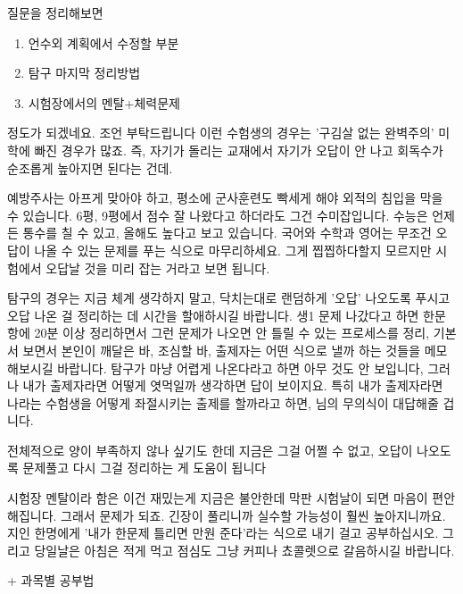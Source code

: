     질문을 정리해보면
    \begin{enumerate}
        \item 언수외 계획에서 수정할 부분
        \item 탐구 마지막 정리방법
        \item 시험장에서의 멘탈+체력문제
    \end{enumerate}
    정도가 되겠네요. 조언 부탁드립니다
    \vspace{5mm}
이런 수험생의 경우는 '구김살 없는 완벽주의' 미학에 빠진 경우가 많죠.
즉, 자기가 돌리는 교재에서 자기가 오답이 안 나고 회독수가 순조롭게 높아지면 된다는 건데.
\vspace{5mm}

예방주사는 아프게 맞아야 하고, 평소에 군사훈련도 빡세게 해야 외적의 침입을 막을 수 있습니다.
6평, 9평에서 점수 잘 나왔다고 하더라도 그건 수미잡입니다. 수능은 언제든 통수를 칠 수 있고, 올해도 높다고 보고 있습니다.
국어와 수학과 영어는 무조건 오답이 나올 수 있는 문제를 푸는 식으로 마무리하세요.
그게 찝찝하다할지 모르지만 시험에서 오답날 것을 미리 잡는 거라고 보면 됩니다.
\vspace{5mm}

탐구의 경우는 지금 체계 생각하지 말고, 닥치는대로 랜덤하게 '오답' 나오도록 푸시고
오답 나온 걸 정리하는 데 시간을 할애하시길 바랍니다.
생1 문제 나갔다고 하면 한문항에 20분 이상 정리하면서 그런 문제가 나오면 안 틀릴 수 있는 프로세스를 정리,
기본서 보면서 본인이 깨달은 바, 조심할 바, 출제자는 어떤 식으로 낼까 하는 것들을 메모해보시길 바랍니다.
탐구가 마냥 어렵게 나온다라고 하면 아무 것도 안 보입니다, 그러나 내가 출제자라면 어떻게 엿먹일까 생각하면 답이 보이지요.
특히 내가 출제자라면 나라는 수험생을 어떻게 좌절시키는 출제를 할까라고 하면, 님의 무의식이 대답해줄 겁니다.
\vspace{5mm}

전체적으로 양이 부족하지 않나 싶기도 한데 지금은 그걸 어쩔 수 없고, 오답이 나오도록 문제풀고 다시 그걸 정리하는 게 도움이 됩니다
\vspace{5mm}

시험장 멘탈이라 함은 이건 재밌는게
지금은 불안한데 막판 시험날이 되면 마음이 편안해집니다. 그래서 문제가 되죠. 긴장이 풀리니까 실수할 가능성이 훨씬 높아지니까요.
지인 한명에게 '내가 한문제 틀리면 만원 준다'라는 식으로 내기 걸고 공부하십시오.
그리고 당일날은 아침은 적게 먹고 점심도 그냥 커피나 쵸콜렛으로 갈음하시길 바랍니다.
\vspace{5mm}

+ 과목별 공부법
\vspace{5mm}

